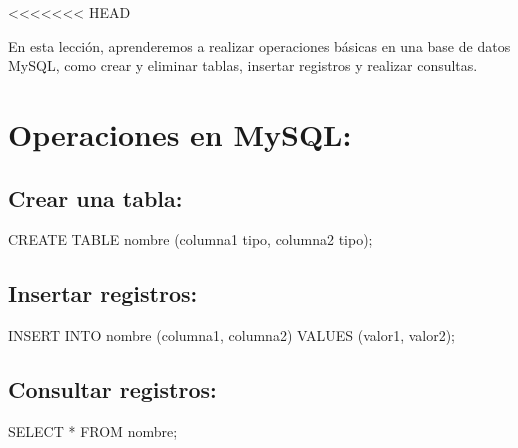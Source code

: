 \documentclass[
  a4paper,
  onepage,
  openany]{scrreprt}
\newenvironment{Shaded}{\begin{snugshade}}{\end{snugshade}}
\newcommand{\KeywordTok}[1]{\textcolor[rgb]{0.00,0.23,0.31}{#1}}
\newcommand{\NormalTok}[1]{\textcolor[rgb]{0.00,0.23,0.31}{#1}}
\newcommand{\OperatorTok}[1]{\textcolor[rgb]{0.37,0.37,0.37}{#1}}
\begin{document}
\textless\textless\textless\textless\textless\textless\textless{} HEAD

En esta lección, aprenderemos a realizar operaciones básicas en una base
de datos MySQL, como crear y eliminar tablas, insertar registros y
realizar consultas.

\hypertarget{operaciones-en-mysql}{%
\section{Operaciones en MySQL:}\label{operaciones-en-mysql}}

\hypertarget{crear-una-tabla-2}{%
\subsection{Crear una tabla:}\label{crear-una-tabla-2}}

\begin{Shaded}
\begin{Highlighting}[]
\KeywordTok{CREATE} \KeywordTok{TABLE}\NormalTok{ nombre (columna1 tipo, columna2 tipo);}
\end{Highlighting}
\end{Shaded}

\hypertarget{insertar-registros-2}{%
\subsection{Insertar registros:}\label{insertar-registros-2}}

\begin{Shaded}
\begin{Highlighting}[]
\KeywordTok{INSERT} \KeywordTok{INTO}\NormalTok{ nombre (columna1, columna2) }\KeywordTok{VALUES}\NormalTok{ (valor1, valor2);}
\end{Highlighting}
\end{Shaded}

\hypertarget{consultar-registros-2}{%
\subsection{Consultar registros:}\label{consultar-registros-2}}

\begin{Shaded}
\begin{Highlighting}[]
\KeywordTok{SELECT} \OperatorTok{*} \KeywordTok{FROM}\NormalTok{ nombre;}
\end{Highlighting}
\end{Shaded}
\end{document}
